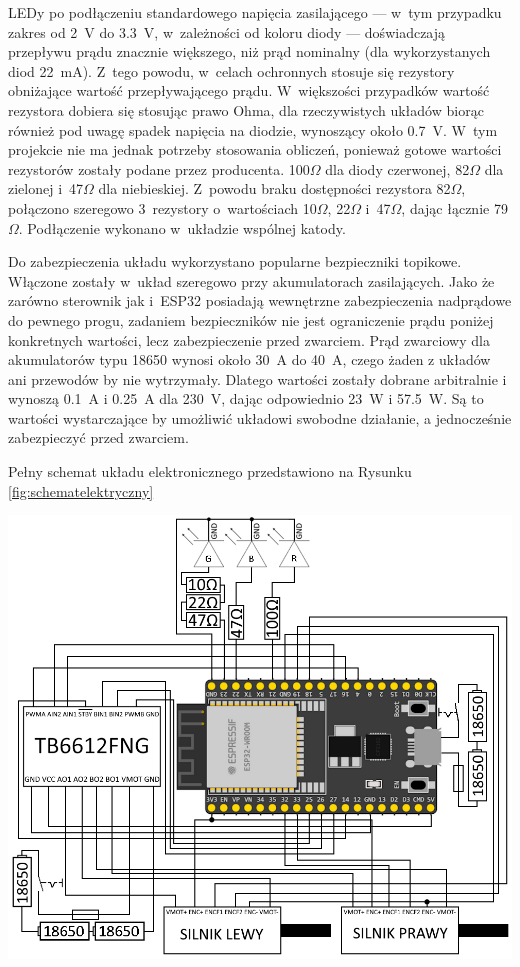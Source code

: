 LEDy po podłączeniu standardowego napięcia zasilającego --- w~tym przypadku zakres od 2~V do 3.3~V, w~zależności od koloru diody --- doświadczają przepływu prądu znacznie większego, niż prąd nominalny (dla wykorzystanych diod 22~mA). Z~tego powodu, w~celach ochronnych stosuje się rezystory obniżające wartość przepływającego prądu. W~większości przypadków wartość rezystora dobiera się stosując prawo Ohma, dla rzeczywistych układów biorąc również pod uwagę spadek napięcia na diodzie, wynoszący około 0.7~V. W~tym projekcie nie ma jednak potrzeby stosowania obliczeń, ponieważ gotowe wartości rezystorów zostały podane przez producenta. 100$\Omega$ dla diody czerwonej, 82$\Omega$ dla zielonej i~47$\Omega$ dla niebieskiej. Z~powodu braku dostępności rezystora 82$\Omega$, połączono szeregowo 3~rezystory o~wartościach 10$\Omega$, 22$\Omega$ i~47$\Omega$, dając łącznie 79$\Omega$. Podłączenie wykonano w~układzie wspólnej katody.

Do zabezpieczenia układu wykorzystano popularne bezpieczniki topikowe. Włączone zostały w~układ szeregowo przy akumulatorach zasilających. Jako że zarówno sterownik jak i~ESP32 posiadają wewnętrzne zabezpieczenia nadprądowe do pewnego progu, zadaniem bezpieczników nie jest ograniczenie prądu poniżej konkretnych wartości, lecz zabezpieczenie przed zwarciem. Prąd zwarciowy dla akumulatorów typu 18650 wynosi około 30~A do 40~A, czego żaden z układów ani przewodów by nie wytrzymały. Dlatego wartości zostały dobrane arbitralnie i wynoszą 0.1~A i 0.25~A dla 230~V, dając odpowiednio 23~W i 57.5~W. Są to wartości wystarczające by umożliwić układowi swobodne działanie, a jednocześnie zabezpieczyć przed zwarciem.

Pełny schemat układu elektronicznego przedstawiono na Rysunku \ref{fig:schematelektryczny}

\begin{center}
  \includegraphics[scale=0.61]{images/Schemat_elektryczny.png}
  \label{fig:schematelektryczny}
\end{center}

